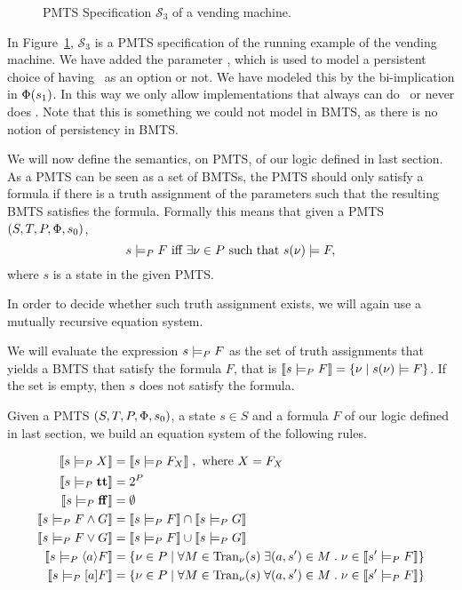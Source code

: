 \begin{figure}[ht]
	\begin{center}	
		
	\end{center}
	\caption{PMTS Specification $\mathcal{S}_3$ of a vending machine.}\label{fig:bmts_vends3}
\end{figure}

\begin{example}
	In Figure~\ref{fig:bmts_vends3}, $\mathcal{S}_3$ is a PMTS specification of the running example of the vending machine. We have added the parameter 
	\mustChoc, which is used to model a persistent choice of having \Choc ~as an option or not. We have modeled this by the bi-implication in $\mathrm{\Phi}(s_1)$. In this way we only allow implementations that always can do \Choc~or never does 
	\Choc. Note that this is something we could not model in BMTS, as there is no notion of persistency in BMTS.
\end{example}

We will now define the semantics, on PMTS, of our logic defined in last section.
As a PMTS can be seen as a set of BMTSs, the PMTS should only satisfy a formula if there is a truth assignment of the parameters such that the resulting BMTS satisfies the formula. Formally this means that given a PMTS $(S,T,P,\mathrm{\Phi}, s_0)$,
\[
	s \models_P F \text{ iff } \exists \nu \in P \text{ such that } s(\nu) \models F,
\]
where $s$ is a state in the given PMTS.

In order to decide whether such truth assignment exists, we will again use a mutually recursive equation system. 

We will evaluate the expression $s \models_P F$ as the set of truth assignments that yields a BMTS that satisfy the formula $F$, that is $\llbracket s \models_P F \rrbracket = \{ \nu \mid s(\nu) \models F\}$. If the set is empty, then $s$ does not satisfy the formula.

Given a PMTS $(S,T,P,\mathrm{\Phi}, s_0)$, a state $s \in S$ and a formula $F$ of our logic defined in last section, we build an equation system of the following rules.

\begin{align*}
\llbracket s \models_P X  \rrbracket &= \llbracket  s \models_P F_X \rrbracket\; , \text{ where } X=F_X \\
\llbracket s \models_P \mathbf{tt} \rrbracket &= 2^P \\
\llbracket s \models_P \mathbf{ff} \rrbracket &= \emptyset \\
\llbracket s \models_P F \wedge G \rrbracket &= \llbracket  s \models_P F \rrbracket \cap \llbracket s\models_P G \rrbracket \\
\llbracket s \models_P F \vee G \rrbracket &= \llbracket  s \models_P F \rrbracket \cup \llbracket s\models_P G \rrbracket \\
\llbracket s \models_P \langle a \rangle F  \rrbracket &= \left \{ \nu \in P  \mid \forall M \in \mathrm{Tran}_\nu(s) \; \exists (a,s') \in M \;.\; \nu \in \llbracket s' \models_P F \rrbracket \right \} \\
\llbracket s\models_P [a]F \rrbracket &= \{ \nu \in P \mid \forall M \in \mathrm{Tran}_\nu (s)\; \forall (a,s') \in M \;.\; \nu \in \llbracket s' \models_P F \rrbracket\}
\end{align*}

